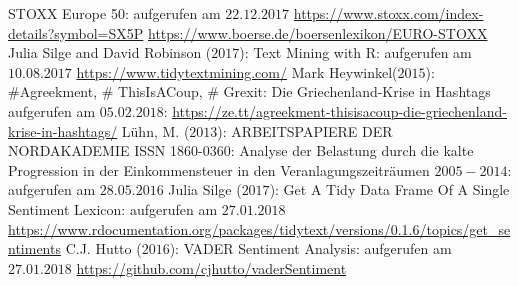 
	\newpage
	\begin{thebibliography}{12345678}
	 STOXX Europe 50: aufgerufen am $22.12.2017$ \url{https://www.stoxx.com/index-details?symbol=SX5P}
	  \url{https://www.boerse.de/boersenlexikon/EURO-STOXX}	
	 Julia Silge and David Robinson ($2017$): Text Mining with R: aufgerufen am $10.08.2017$ \url{https://www.tidytextmining.com/}
	 Mark Heywinkel($2015$): \#Agreekment, \# ThisIsACoup, \# Grexit: Die Griechenland-Krise in Hashtags
	aufgerufen am $05.02.2018$:  \url{https://ze.tt/agreekment-thisisacoup-die-griechenland-krise-in-hashtags/}
	 Lühn, M. ($2013$): ARBEITSPAPIERE DER NORDAKADEMIE ISSN 1860-0360: Analyse der Belastung durch die kalte Progression in der Einkommensteuer in den Veranlagungszeiträumen $2005-2014$: aufgerufen am $28.05.2016$ %
	 Julia Silge ($2017$): Get A Tidy Data Frame Of A Single Sentiment Lexicon: aufgerufen am $27.01.2018$ \url{https://www.rdocumentation.org/packages/tidytext/versions/0.1.6/topics/get_sentiments}
	 C.J. Hutto ($2016$): VADER Sentiment Analysis: aufgerufen am $27.01.2018$ \url{https://github.com/cjhutto/vaderSentiment}
\end{thebibliography}
\clearpage